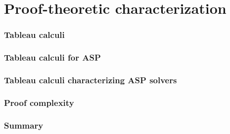 \part{Proof-theoretic characterization}

\section{Tableau calculi}

\section{Tableau calculi for ASP}

\section{Tableau calculi characterizing ASP solvers}

\section{Proof complexity}

\section{Summary}

%

